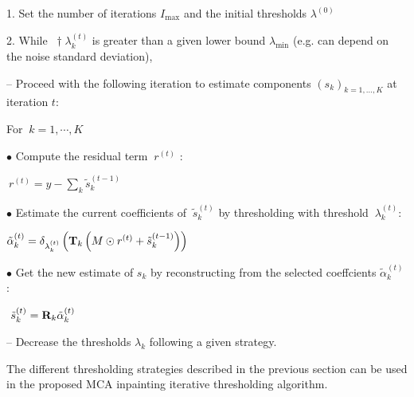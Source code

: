 \begin{center}
\begin{minipage}[b]{0.9\linewidth}
\vspace{0.1in}
\footnotesize{\textsf{1. Set the number of iterations $I_{\max}$ and the initial thresholds $ \lambda^{(0)} $}

\textsf{2. While  $ ~†\lambda^{(t)}_{k}$ is greater than a given lower bound $\lambda_{\min}$ (e.g. can depend on the noise standard deviation), }

\hspace{0.15in} \textsf{-- Proceed with the following iteration to estimate components $ (s_k)_{k=1,\ldots,K}$ at iteration $t$:}

\hspace{0.25in} \textsf{For $ ~ k=1,\cdots,K$ }

\hspace{0.5in} \textsf{$\bullet$ Compute the residual term $  ~ r^{(t)}$ :}

\hspace{0.75in} \textsf{ $  ~ r^{(t)} = y - \sum_{k} \tilde{s}_{k}^{(t-1)}$}

\hspace{0.5in} \textsf{$\bullet$ Estimate the current coefficients of $  ~ \tilde{s}_k^{(t)}$ by thresholding with threshold $ ~ \lambda_k^{(t)}$:}

\hspace{0.75in} \textsf{$  \tilde{\alpha}_k^{(t)} = \delta_{\lambda_k^{(t)}}\left( {\bf T}_k \left(M \odot  r^{(t)}+\tilde{s}_k^{(t-1)}\right)\right)$}

\hspace{0.5in} \textsf{$\bullet$ Get the new estimate of $s_k$ by reconstructing from the selected coeffcients $  \tilde{\alpha}_k^{(t)}$ :}

\hspace{0.75in} \textsf{$  ~ \tilde{s}_k^{(t)} = {\bf R}_k \tilde{\alpha}_k^{(t)}$}

\hspace{0.15in} \textsf{-- Decrease the thresholds $\lambda_{k}$ following a given strategy.}
}
\vspace{0.05in}
\end{minipage}
\end{center} 
The different thresholding strategies described in the previous section can be used in the proposed MCA inpainting iterative thresholding algorithm. 
%
